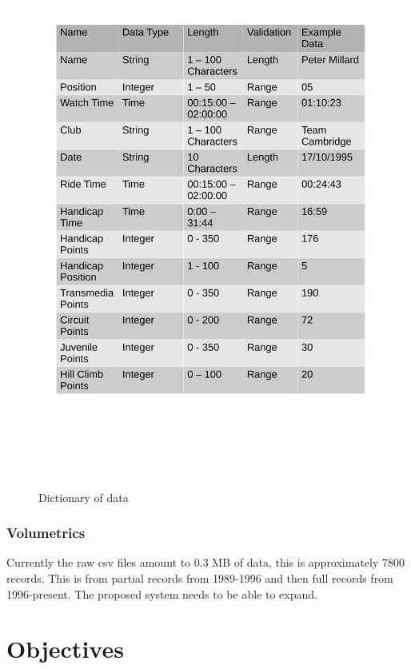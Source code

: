 \begin{figure}[H]
	\includegraphics[width=\textwidth]{./DataDic.pdf}
	\caption{Dictionary of data}
\end{figure}

\subsubsection{Volumetrics}
Currently the raw csv files amount to 0.3 MB of data, this is approximately 7800 records. This is from partial records from 1989-1996 and then full records from 1996-present. The proposed system needs to be able to expand.
\section{Objectives}

